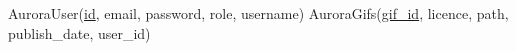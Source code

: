 

AuroraUser(\underline{id}, email, password, role, username)
AuroraGifs(\underline{gif_id}, licence, path, publish_date, \uparrow user_id)
